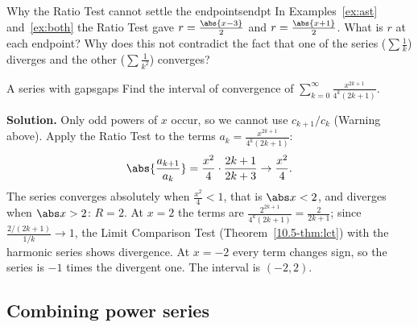 \documentclass[11pt]{article}
\begin{document}
\begin{think}{Why the Ratio Test cannot settle the endpoints}{endpt}
In Examples~\ref{ex:ast} and~\ref{ex:both} the Ratio Test gave $r=\frac{\abs{x-3}}2$ and $r=\frac{\abs{x+1}}2$. What is $r$ at each endpoint? Why does this not contradict the fact that one of the series ($\sum\frac1k$) diverges and the other ($\sum\frac1{k^2}$) converges?
\end{think}

\begin{exmp}{A series with gaps}{gaps}
Find the interval of convergence of $\displaystyle\sum_{k=0}^\infty\frac{x^{2k+1}}{4^k(2k+1)}$.

\textbf{Solution.} Only odd powers of $x$ occur, so we cannot use $c_{k+1}/c_k$ (Warning above). Apply the Ratio Test to the terms $a_k=\frac{x^{2k+1}}{4^k(2k+1)}$:
\[
\abs{\frac{a_{k+1}}{a_k}}=\frac{x^2}4\cdot\frac{2k+1}{2k+3}\to\frac{x^2}4 .
\]
The series converges absolutely when $\frac{x^2}4<1$, that is $\abs x<2$, and diverges when $\abs x>2$: $R=2$. At $x=2$ the terms are $\frac{2^{2k+1}}{4^k(2k+1)}=\frac2{2k+1}$; since $\frac{2/(2k+1)}{1/k}\to1$, the Limit Comparison Test (Theorem~\ref{10.5-thm:lct}) with the harmonic series shows divergence. At $x=-2$ every term changes sign, so the series is $-1$ times the divergent one. The interval is $(-2,2)$.
\end{exmp}

\subsection*{Combining power series}
\end{document}
